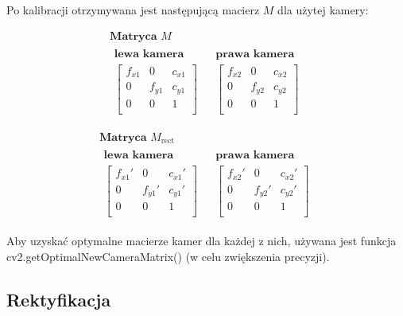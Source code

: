 \documentclass[magisterska]{pracadypl}
\begin{document}
Po kalibracji otrzymywana jest następującą macierz $M$ dla użytej kamery:

\[
\begin{array}{c}
\textbf{Matryca } M \\[1ex]
\begin{array}{ccc}
\textbf{lewa kamera} && \textbf{prawa kamera} \\
\left[\begin{array}{ccc}
f_{x1} & 0 & c_{x1} \\
0 & f_{y1} & c_{y1} \\
0 & 0 & 1 \\
\end{array}\right]
&&
\left[\begin{array}{ccc}
f_{x2} & 0 & c_{x2} \\
0 & f_{y2} & c_{y2} \\
0 & 0 & 1 \\
\end{array}\right]
\end{array}
\end{array}
\]

\vspace{2ex}

\[
\begin{array}{c}
\textbf{Matryca } M_{\text{rect}} \\[1ex]
\begin{array}{ccc}
\textbf{lewa kamera} && \textbf{prawa kamera} \\
\left[\begin{array}{ccc}
f_{x1}' & 0 & c_{x1}' \\
0 & f_{y1}' & c_{y1}' \\
0 & 0 & 1 \\
\end{array}\right]
&&
\left[\begin{array}{ccc}
f_{x2}' & 0 & c_{x2}' \\
0 & f_{y2}' & c_{y2}' \\
0 & 0 & 1 \\
\end{array}\right]
\end{array}
\end{array}
\]

Aby uzyskać optymalne macierze kamer dla każdej z nich, używana jest funkcja \\ 
cv2.getOptimalNewCameraMatrix() (w celu zwiększenia precyzji).

\subsection{Rektyfikacja}
\end{document}
